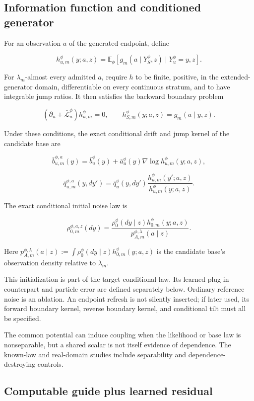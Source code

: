 \documentclass[11pt]{article}
\begin{document}
\subsection{Information function and conditioned generator}
\label{sec:information-function-and-conditioned-generator}

For an observation \(a\) of the generated endpoint, define

\[
h_{u,m}^{\phi}(y;a,z)
=\mathbb E_\phi\!\left[
g_m(a\mid Y_S^\phi,z)\mid Y_u^\phi=y,z
\right].
\]

For \(\lambda_m\)-almost every admitted \(a\), require \(h\) to be finite, positive, in the extended-generator domain, differentiable on every continuous stratum, and to have integrable jump ratios. It then satisfies the backward boundary problem

\[
(\partial_u+\bar{\mathcal L}_u^\phi)h_{u,m}^\phi=0,
\qquad
h_{S,m}^\phi(y;a,z)=g_m(a\mid y,z).
\]

Under these conditions, the exact conditional drift and jump kernel of the candidate base are

\[
\bar b_{u,m}^{\phi,a}(y)
=\bar b_u^\phi(y)
+\bar a_u^\phi(y)\nabla\log h_{u,m}^{\phi}(y;a,z),
\]

\[
\bar q_{u,m}^{\phi,a}(y,dy')
=\bar q_u^\phi(y,dy')
\frac{h_{u,m}^{\phi}(y';a,z)}
     {h_{u,m}^{\phi}(y;a,z)}.
\]

The exact conditional initial noise law is

\[
\rho_{0,m}^{\phi,a,z}(dy)
=\frac{\rho_0^\phi(dy\mid z)h_{0,m}^{\phi}(y;a,z)}
       {p_{A,m}^{\phi,\lambda}(a\mid z)}.
\]

Here \(p_{A,m}^{\phi,\lambda}(a\mid z) :=\int\rho_0^\phi(dy\mid z)h_{0,m}^\phi(y;a,z)\) is the candidate base's observation density relative to \(\lambda_m\).

This initialization is part of the target conditional law. Its learned plug-in counterpart and particle error are defined separately below. Ordinary reference noise is an ablation. An endpoint refresh is not silently inserted; if later used, its forward boundary kernel, reverse boundary kernel, and conditional tilt must all be specified.

The common potential can induce coupling when the likelihood or base law is nonseparable, but a shared scalar is not itself evidence of dependence. The known-law and real-domain studies include separability and dependence-destroying controls.

\subsection{Computable guide plus learned residual}
\label{sec:computable-guide-plus-learned-residual}
\end{document}
